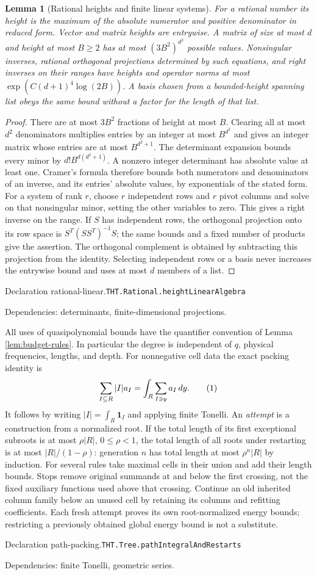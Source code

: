 \documentclass[11pt]{article}
\newtheorem{lemma}[theorem]{Lemma}
\theoremstyle{definition}
\newcommand{\one}{\mathbf 1}
\newcommand{\eqtag}[1]{\refstepcounter{equation}\tag{\theequation}\label{#1}}
\numberwithin{equation}{section}
\newcommand{\bp}[3]{\par\smallskip\begingroup\footnotesize
\noindent\hypertarget{bp:#1}{\textsf{Declaration #1.}}\quad\nolinkurl{#2}\par
\noindent\textsf{Dependencies:} #3.\par\endgroup\smallskip}
\begin{document}
\begin{lemma}[Rational heights and finite linear systems]\label{lem:rational-linear}
For a rational number its height is the maximum of the absolute numerator and positive denominator in reduced form. Vector and matrix heights are entrywise. A matrix of size at most $d$ and height at most $B\ge2$ has at most $(3B^2)^{d^2}$ possible values. Nonsingular inverses, rational orthogonal projections determined by such equations, and right inverses on their ranges have heights and operator norms at most $\exp(C(d+1)^4\log(2B))$. A basis chosen from a bounded-height spanning list obeys the same bound without a factor for the length of that list.
\end{lemma}
\begin{proof}
There are at most $3B^2$ fractions of height at most $B$. Clearing all at most $d^2$ denominators multiplies entries by an integer at most $B^{d^2}$ and gives an integer matrix whose entries are at most $B^{d^2+1}$. The determinant expansion bounds every minor by $d!B^{d(d^2+1)}$. A nonzero integer determinant has absolute value at least one. Cramer's formula therefore bounds both numerators and denominators of an inverse, and its entries' absolute values, by exponentials of the stated form. For a system of rank $r$, choose $r$ independent rows and $r$ pivot columns and solve on that nonsingular minor, setting the other variables to zero. This gives a right inverse on the range. If $S$ has independent rows, the orthogonal projection onto its row space is $S^T(SS^T)^{-1}S$; the same bounds and a fixed number of products give the assertion. The orthogonal complement is obtained by subtracting this projection from the identity. Selecting independent rows or a basis never increases the entrywise bound and uses at most $d$ members of a list.
\end{proof}
\bp{rational-linear}{THT.Rational.heightLinearAlgebra}{determinants, finite-dimensional projections}

All uses of quasipolynomial bounds have the quantifier convention of Lemma \ref{lem:budget-rules}. In particular the degree is independent of $q$, physical frequencies, lengths, and depth. For nonnegative cell data the exact packing identity is
\[
 \sum_{I\subseteq R}|I|a_I=\int_R\sum_{I\ni y}a_I\,dy.
 \eqtag{eq:path}
\]
It follows by writing $|I|=\int_R\one_I$ and applying finite Tonelli. An \emph{attempt} is a construction from a normalized root. If the total length of its first exceptional subroots is at most $\rho|R|$, $0\le\rho<1$, the total length of all roots under restarting is at most $|R|/(1-\rho)$: generation $n$ has total length at most $\rho^n|R|$ by induction. For several rules take maximal cells in their union and add their length bounds. Stops remove original summands at and below the first crossing, not the fixed auxiliary functions used above that crossing. Continue an old inherited column family below an unused cell by retaining its columns and refitting coefficients. Each fresh attempt proves its own root-normalized energy bounds; restricting a previously obtained global energy bound is not a substitute.
\bp{path-packing}{THT.Tree.pathIntegralAndRestarts}{finite Tonelli, geometric series}
\end{document}

